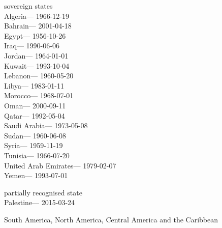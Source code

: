sovereign states\\
\hspace*{0.333em}Algeria--- 1966-12-19\\
\hspace*{0.333em}Bahrain--- 2001-04-18\\
\hspace*{0.333em}Egypt--- 1956-10-26\\
\hspace*{0.333em}Iraq--- 1990-06-06\\
\hspace*{0.333em}Jordan--- 1964-01-01\\
\hspace*{0.333em}Kuwait--- 1993-10-04\\
\hspace*{0.333em}Lebanon--- 1960-05-20\\
\hspace*{0.333em}Libya--- 1983-01-11\\
\hspace*{0.333em}Morocco--- 1968-07-01\\
\hspace*{0.333em}Oman--- 2000-09-11\\
\hspace*{0.333em}Qatar--- 1992-05-04\\
\hspace*{0.333em}Saudi Arabia--- 1973-05-08\\
\hspace*{0.333em}Sudan--- 1960-06-08\\
\hspace*{0.333em}Syria--- 1959-11-19\\
\hspace*{0.333em}Tunisia--- 1966-07-20\\
\hspace*{0.333em}United Arab Emirates--- 1979-02-07\\
\hspace*{0.333em}Yemen--- 1993-07-01

partially recognised state\\
\hspace*{0.333em}Palestine--- 2015-03-24

South America, North America, Central America and the Caribbean

